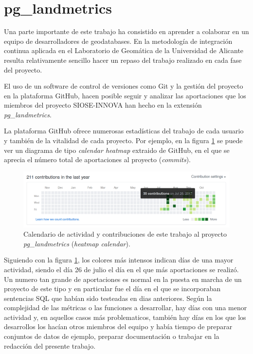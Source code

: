 \section{pg\_landmetrics \label{sec:pglandmetrics}}

Una parte importante de este trabajo ha consistido en aprender a colaborar en un equipo de desarrolladores de geodatabases. En la metodología de integración continua aplicada en el Laboratorio de Geomática de la Universidad de Alicante resulta relativamente sencillo hacer un repaso del trabajo realizado en cada fase del proyecto.

El uso de un software de control de versiones como Git y la gestión del proyecto en la plataforma GitHub, hacen posible seguir y analizar las aportaciones que los miembros del proyecto SIOSE-INNOVA han hecho en la extensión \textit{pg\_landmetrics}.

La plataforma GitHub ofrece numerosas estadísticas del trabajo de cada usuario y también de la vitalidad de cada proyecto. Por ejemplo, en la figura \ref{fig:contrib} se puede ver un diagrama de tipo \textit{calendar heatmap} extraido de GitHub, en el que se aprecia el número total de aportaciones al proyecto (\textit{commits}). 

\begin{figure}
\begin{center}
\includegraphics[width=\textwidth]{ResultadosyDiscusion/Figs/contributions.png}
\caption{Calendario de actividad y contribuciones de este trabajo al proyecto \textit{pg\_landmetrics} (\textit{heatmap calendar}). \label{fig:contrib}}
\end{center}
\end{figure}

Siguiendo con la figura \ref{fig:contrib}, los colores más intensos indican días de una mayor actividad, siendo el día 26 de julio el día en el que más aportaciones se realizó. Un numero tan grande de aportaciones es normal en la puesta en marcha de un proyecto de este tipo y en particular fue el día en el que se incorporaban sentencias SQL que habían sido testeadas en dias anteriores. Según la complejidad de las métricas o las funciones a desarrollar, hay días con una menor actividad y, en aquellos casos más problematicos, también hay días en los que los desarrollos los hacían otros miembros del equipo y había tiempo de preparar conjuntos de datos de ejemplo, preparar documentación o trabajar en la redacción del presente trabajo.


